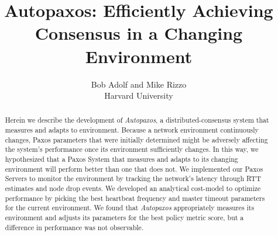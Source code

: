 \documentclass[pageno]{jpaper}
\title{Autopaxos: Efficiently Achieving Consensus in a Changing Environment}
\author{Bob Adolf and Mike Rizzo\\Harvard University}
\date{}
\begin{document}
\maketitle

\begin{abstract}
Herein we describe the development of \emph{Autopaxos}, a distributed-consensus system that measures and adapts to environment.  Because a network environment continuously changes, Paxos parameters that were initially determined might be adversely affecting the system's performance once its environment sufficiently changes.  In this way, we hypothesized that a Paxos System that measures and adapts to its changing environment will perform better than one that does not.  We implemented our Paxos Servers to monitor the environment by tracking the network's latency through RTT estimates and node drop events.  We developed an analytical cost-model to optimize performance by picking the best heartbeat frequency and master timeout parameters for the current environment.  We found that \emph{Autopaxos} appropriately measures its environment and adjusts its parameters for the best policy metric score, but a difference in performance was not observable.
\end{abstract}










\end{document}
